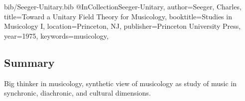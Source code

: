 
\begin{tags}
\end{tags}

\begin{filecontents*}{bib/Seeger-Unitary.bib}
@InCollection{Seeger-Unitary,
author={Seeger, Charles},
title={Toward a Unitary Field Theory for Musicology},
booktitle={Studies in Musicology I},
location={Princeton, NJ},
publisher={Princeton University Press},
year={1975},
keywords={musicology},
}
\end{filecontents*}
\cite{Seeger-Unitary}

\subsection{Summary}
Big thinker in musicology, synthetic view of musicology as study of music in synchronic, diachronic, and cultural dimensions.

